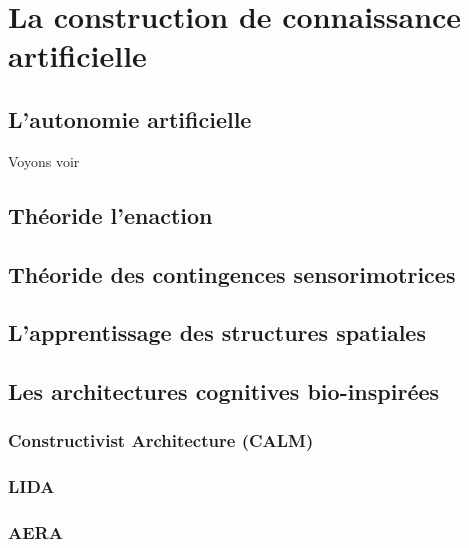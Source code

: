 \chapter{La construction de connaissance artificielle}

\section{L'autonomie artificielle}

Voyons voir

\section{Théoride l'enaction}

\section{Théoride des contingences sensorimotrices}

\section{L'apprentissage des structures spatiales}


\section{Les architectures cognitives bio-inspirées}

\subsection{Constructivist Architecture (CALM)}

\subsection{LIDA}

\subsection{AERA}
